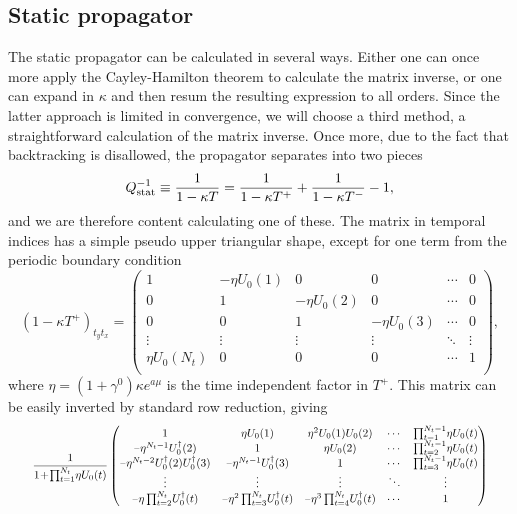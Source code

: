 \subsection{Static propagator}

The static propagator can be calculated in several ways. Either one can once
more apply the Cayley-Hamilton theorem to calculate the matrix inverse, or one
can expand in $\kappa$ and then resum the resulting expression to all orders.
Since the latter approach is limited in convergence, we will choose a third
method, a straightforward calculation of the matrix inverse. Once more, due to
the fact that backtracking is disallowed, the propagator separates into two
pieces
%
\begin{equation} \label{eq:static_prop_separation}
  Q_{\text{stat}}^{-1} \equiv \frac{1}{1 - \kappa T} = \frac{1}{1 - \kappa T^+} + \frac{1}{1 - \kappa
    T^-} -1,
\end{equation}
%
and we are therefore content calculating one of these. The matrix in temporal
indices has a simple pseudo upper triangular shape, except for one term from the
periodic boundary condition
%
\begin{equation}
  (1-\kappa T^+)_{t_y t_x} = 
  \begin{pmatrix}
    1 & \minus\eta U_0 (1) & 0 & 0 & \cdots & 0\\
    0 & 1 & \minus\eta U_0 (2) & 0 & \cdots & 0\\
    0 & 0 & 1 & \minus\eta U_0 (3) & \cdots & 0\\
    \vdots & \vdots & \vdots & \vdots & \ddots & \vdots\\
    \eta U_0 (N_t) & 0 & 0 & 0 & \cdots & 1\\
  \end{pmatrix},
\end{equation}
%
where $\eta = (1+\gamma^0)\kappa e^{a\mu}$ is the time independent factor in
$T^+$. This matrix can be easily inverted by standard row reduction, giving
%
\begin{equation}
  \scalemath{0.8}{%
  \frac{1}{1\!+\!\prod_{t=1}^{N_t}\!\eta U_0(t)}
  \begin{pmatrix}
    1 & \eta U_0(1) & \eta^2 U_0(1) U_0(2) & \cdots & \prod_{t=1}^{N_t-1}\!\eta U_0(t)\\
    \minus\eta^{N_t-1} U^{\dagger}_0(2) & 1 & \eta U_0(2) & \cdots & \prod_{t=2}^{N_t-1}\!\eta U_0(t)\\
    \minus\eta^{N_t-2} U^{\dagger}_0(2) U^{\dagger}_0(3) & \minus\eta^{N_t-1}
      U^{\dagger}_0(3) & 1 & \cdots & \prod_{t=3}^{N_t-1}\!\eta U_0(t)\\
    \vdots  & \vdots  & \vdots  & \ddots & \vdots \\
    \minus\eta\prod_{t=2}^{N_t}\!U^{\dagger}_0(t) &
    \minus\eta^2\prod_{t=3}^{N_t}\!U^{\dagger}_0(t) &
    \minus\eta^3\prod_{t=4}^{N_t}\!U^{\dagger}_0(t) & \cdots & 1
  \end{pmatrix}}
\end{equation}
